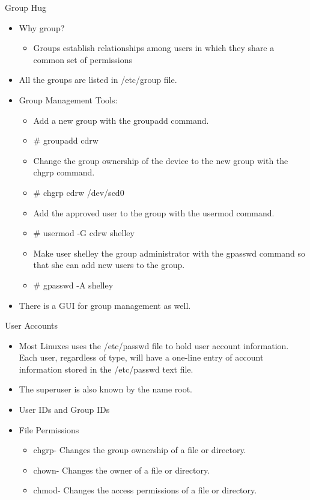\documentclass{beamer}
\begin{document}
\begin{frame}{Group Hug}
\begin{itemize}
\item Why group?
\begin{itemize}
\item Groups establish relationships among users in which they share a common set of permissions
\end{itemize}
\item All the groups are listed in /etc/group file.
\item Group Management Tools:
\begin{itemize}
\item Add a new group with the groupadd command.
\item \# groupadd cdrw
\item Change the group ownership of the device to the new group with the chgrp command.
\item \# chgrp cdrw /dev/scd0
\item Add the approved user to the group with the usermod command.
\item \# usermod -G cdrw  shelley
\item Make user shelley the group administrator with the gpasswd command so that she can add new users to the group.
\item \# gpasswd -A shelley
\end{itemize}
\item There is a GUI for group management as well.
\end{itemize}
\end{frame}

\begin{frame}{User Accounts}
\begin{itemize}
\item Most Linuxes uses the /etc/passwd file to hold user account information. Each user, regardless of type, will have a one-line entry of account information stored in the /etc/passwd text file.
\item The superuser is also known by the name root. 
\item User IDs and Group IDs
\item File Permissions
\begin{itemize}
\item chgrp- Changes the group ownership of a file or directory.
\item chown- Changes the owner of a file or directory.
\item chmod- Changes the access permissions of a file or directory.
\end{itemize}
\end{itemize}
\end{frame}
\end{document}
